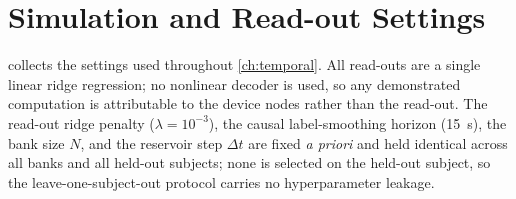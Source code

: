 \section{Simulation and Read-out Settings}\label{app:ch5_settings}

 collects the settings used throughout
\cref{ch:temporal}. All read-outs are a single linear ridge regression; no
nonlinear decoder is used, so any demonstrated computation is attributable to the
device nodes rather than the read-out. The read-out ridge penalty
($\lambda=10^{-3}$), the causal label-smoothing horizon (\SI{15}{\second}), the bank
size $N$, and the reservoir step $\Delta t$ are fixed \emph{a priori} and held
identical across all banks and all held-out subjects; none is selected on the
held-out subject, so the leave-one-subject-out protocol carries no hyperparameter
leakage.

